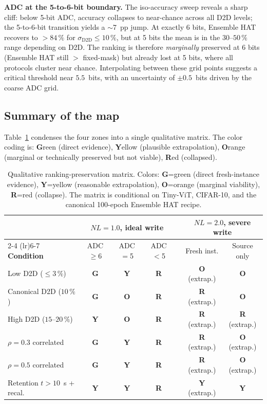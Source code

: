 \textbf{ADC at the 5-to-6-bit boundary.}  The iso-accuracy sweep reveals a sharp cliff: below 5-bit ADC, accuracy collapses to near-chance across all D2D levels; the 5-to-6-bit transition yields a $\sim$7~pp jump.  At exactly 6 bits, Ensemble HAT recovers to $>84\,\%$ for $\sigma_{\mathrm{D2D}} \le 10\,\%$, but at 5 bits the mean is in the $30$--$50\,\%$ range depending on D2D.  The ranking is therefore \emph{marginally} preserved at 6 bits (Ensemble HAT still $>$ fixed-mask) but already lost at 5 bits, where all protocols cluster near chance.  Interpolating between these grid points suggests a critical threshold near $5.5$~bits, with an uncertainty of $\pm 0.5$~bits driven by the coarse ADC grid.

\subsection{Summary of the map}

Table~\ref{tab:ranking-summary} condenses the four zones into a single qualitative matrix.  The color coding is: \textbf{G}reen (direct evidence), \textbf{Y}ellow (plausible extrapolation), \textbf{O}range (marginal or technically preserved but not viable), \textbf{R}ed (collapsed).

\begin{table}[t]
    \centering
    \caption{Qualitative ranking-preservation matrix.  Colors: \textbf{G}=green (direct fresh-instance evidence), \textbf{Y}=yellow (reasonable extrapolation), \textbf{O}=orange (marginal viability), \textbf{R}=red (collapse).  The matrix is conditional on Tiny-ViT, CIFAR-10, and the canonical 100-epoch Ensemble HAT recipe.}
    \label{tab:ranking-summary}
    \small
    \setlength{\tabcolsep}{4pt}
    \begin{tabular}{@{}lcccccc@{}}
        \toprule
        & \multicolumn{3}{c}{\textbf{$NL=1.0$, ideal write}} & & \multicolumn{2}{c}{\textbf{$NL=2.0$, severe write}} \\
        \cmidrule(lr){2-4} \cmidrule(lr){6-7}
        \textbf{Condition} & ADC$\ge$6 & ADC$=$5 & ADC$<$5 & & Fresh inst. & Source only \\
        \midrule
        Low D2D ($\le 3\,\%$) & \textbf{G} & \textbf{Y} & \textbf{R} & & \textbf{O} (extrap.) & \textbf{O} \\
        Canonical D2D ($10\,\%$) & \textbf{G} & \textbf{O} & \textbf{R} & & \textbf{R} (extrap.) & \textbf{O} \\
        High D2D ($15$--$20\,\%$) & \textbf{Y} & \textbf{O} & \textbf{R} & & \textbf{R} (extrap.) & \textbf{R} (extrap.) \\
        $\rho=0.3$ correlated & \textbf{G} & \textbf{Y} & \textbf{R} & & \textbf{R} (extrap.) & \textbf{O} (extrap.) \\
        $\rho=0.5$ correlated & \textbf{G} & \textbf{Y} & \textbf{R} & & \textbf{R} (extrap.) & \textbf{O} (extrap.) \\
        Retention $t>10$~s + recal. & \textbf{Y} & \textbf{Y} & \textbf{R} & & \textbf{Y} (extrap.) & \textbf{Y} \\
        \bottomrule
    \end{tabular}
\end{table}

